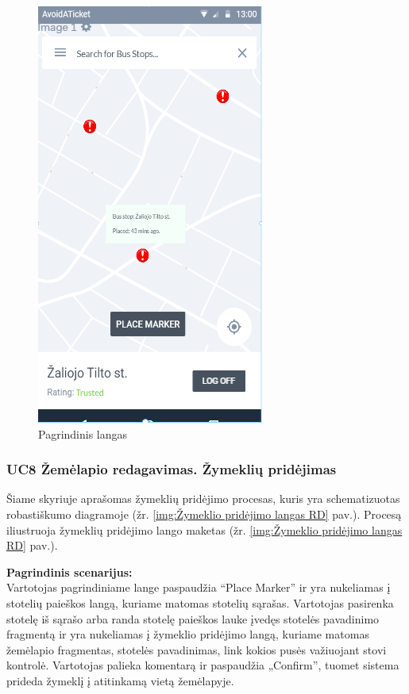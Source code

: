 \documentclass{VUMIFPSkursinis}
\begin{document}
	\begin{figure}[H]
				\centering
				\includegraphics[scale=0.6]{img/mockup_Main_Window}
				\caption{Pagrindinis langas}
				\label{img:Pagrindinis langas}
			\end{figure}

\subsubsection{UC8 Žemėlapio redagavimas. Žymeklių pridėjimas}
	Šiame skyriuje aprašomas žymeklių pridėjimo procesas, kuris yra schematizuotas robastiškumo diagramoje (žr. \ref{img:Žymeklio pridėjimo langas RD} pav.). 
	Procesą iliustruoja žymeklių pridėjimo lango maketas (žr. \ref{img:Žymeklio pridėjimo langas RD} pav.).

	\textbf{Pagrindinis scenarijus:}\\
	Vartotojas pagrindiniame lange paspaudžia “Place Marker” ir yra nukeliamas į stotelių paieškos langą, kuriame matomas stotelių sąrašas. Vartotojas pasirenka stotelę iš sąrašo arba randa stotelę paieškos lauke įvedęs stotelės pavadinimo fragmentą ir yra nukeliamas į žymeklio pridėjimo langą, kuriame matomas žemėlapio fragmentas, stotelės pavadinimas, link kokios pusės važiuojant stovi kontrolė. Vartotojas palieka komentarą ir paspaudžia „Confirm”, tuomet sistema prideda žymeklį į atitinkamą vietą žemėlapyje.
\end{document}
